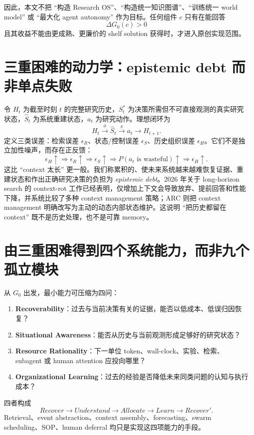 \documentclass[11pt,a4paper]{ctexart}
\begin{document}
因此，本文不把 ``构造 Research OS''、``构造统一知识图谱''、``训练统一 world model'' 或 ``最大化 agent autonomy'' 作为目标。任何组件 $c$ 只有在能回答
\begin{equation}
\Delta G_0(c)>0
\end{equation}
且其收益不能由更成熟、更廉价的 shelf solution 获得时，才进入原创实现范围。

\section{三重困难的动力学：epistemic debt 而非单点失败}

令 $H_t$ 为截至时刻 $t$ 的完整研究历史，$S_t^*$ 为决策所需但不可直接观测的真实研究状态，$\hat S_t$ 为系统重建状态，$a_t$ 为研究动作。理想闭环为
\begin{equation}
H_t\xrightarrow{\phi}\hat S_t\xrightarrow{\pi}a_t\longrightarrow H_{t+1}.
\end{equation}
定义三类误差：检索误差 $\epsilon_R$、状态/控制误差 $\epsilon_S$、历史组织误差 $\epsilon_H$。它们不是独立加性噪声，而存在正反馈：
\begin{equation}
\boxed{
\epsilon_H\uparrow\Rightarrow
\epsilon_R\uparrow\Rightarrow
\epsilon_S\uparrow\Rightarrow
P(a_t\text{ is wasteful})\uparrow\Rightarrow
\epsilon_H\uparrow.}
\end{equation}
这比 ``context 太长'' 更一般。我们称累积的、使未来系统越来越难恢复证据、重建状态和作出正确研究决策的负担为 \emph{epistemic debt}。2026 年关于 long-horizon search 的 context-rot 工作已经表明，仅增加上下文会导致放弃、提前回答和性能下降，并系统比较了多种 context management 策略\cite{xia2026contextrot}；ARC 则把 context management 明确改写为主动的动态内部状态维护\cite{yao2026arc}。这说明 ``把历史都留在 context'' 既不是历史处理，也不是可靠 memory。

\section{由三重困难得到四个系统能力，而非九个孤立模块}

从 $G_0$ 出发，最小能力可压缩为四问：
\begin{enumerate}
\item \textbf{Recoverability}：过去与当前决策有关的证据，能否以低成本、低误归因恢复？
\item \textbf{Situational Awareness}：能否从历史与当前观测形成足够好的研究状态？
\item \textbf{Resource Rationality}：下一单位 token、wall-clock、实验、检索、subagent 或 human attention 应投向哪里？
\item \textbf{Organizational Learning}：过去的经验是否降低未来同类问题的认知与执行成本？
\end{enumerate}
四者构成
\begin{equation}
\boxed{Recover\to Understand\to Allocate\to Learn\to Recover'.}
\end{equation}
Retrieval、event abstraction、context assembly、forecasting、swarm scheduling、SOP、human deferral 均只是实现这四项能力的手段。
\end{document}
